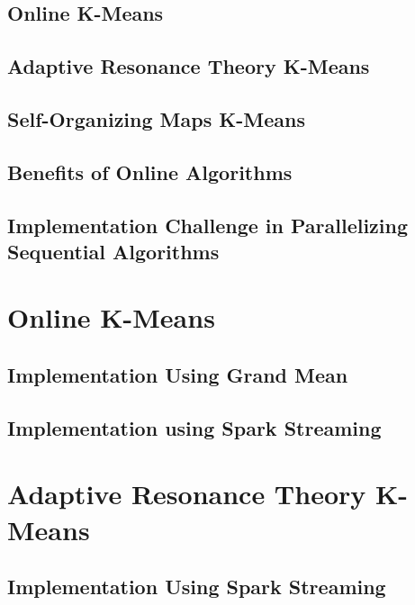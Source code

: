 \documentclass{l4proj}
\begin{document}
\section{Online K-Means}

\section{Adaptive Resonance Theory K-Means}

\section{Self-Organizing Maps K-Means}

\section{Benefits of Online Algorithms}

\section{Implementation Challenge in Parallelizing Sequential Algorithms}


\chapter{Online K-Means}
\label{online}

\section{Implementation Using Grand Mean}

\section{Implementation using Spark Streaming}


\chapter{Adaptive Resonance Theory K-Means}
\label{art}

\section{Implementation Using Spark Streaming}
\end{document}
